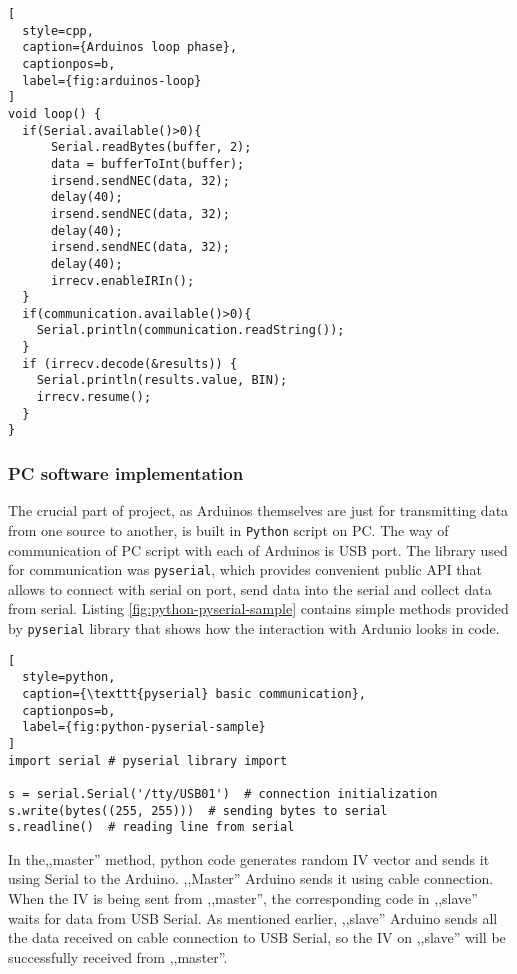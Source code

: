 \begin{minipage}{\linewidth}
\begin{lstlisting}[
  style=cpp,
  caption={Arduinos loop phase},
  captionpos=b,
  label={fig:arduinos-loop}
]
void loop() {
  if(Serial.available()>0){
      Serial.readBytes(buffer, 2);
      data = bufferToInt(buffer);
      irsend.sendNEC(data, 32);
      delay(40);
      irsend.sendNEC(data, 32);
      delay(40);
      irsend.sendNEC(data, 32);
      delay(40);
      irrecv.enableIRIn();
  }
  if(communication.available()>0){
    Serial.println(communication.readString());
  }
  if (irrecv.decode(&results)) {
    Serial.println(results.value, BIN);
    irrecv.resume(); 
  }
}
\end{lstlisting}
\end{minipage}
\subsubsection{PC software implementation}
The crucial part of project, as Arduinos themselves are just for transmitting data from one source to another, is built in \texttt{Python} script on PC. The way of communication of PC script with each of Arduinos is USB port. The library used for communication was \texttt{pyserial}, which provides convenient public API that allows to connect with serial on port, send data into the serial and collect data from serial. Listing \ref{fig:python-pyserial-sample} contains simple methods provided by \texttt{pyserial} library that shows how the interaction with Ardunio looks in code.

\begin{lstlisting}[
  style=python,
  caption={\texttt{pyserial} basic communication},
  captionpos=b,
  label={fig:python-pyserial-sample}
]
import serial # pyserial library import

s = serial.Serial('/tty/USB01')  # connection initialization
s.write(bytes((255, 255)))  # sending bytes to serial
s.readline()  # reading line from serial
\end{lstlisting}

In the,,master'' method, python code generates random IV vector and sends it using Serial to the Arduino. ,,Master'' Arduino sends it using cable connection. When the IV is being sent from ,,master'', the corresponding code in ,,slave'' waits for data from USB Serial. As mentioned earlier, ,,slave'' Arduino sends all the data received on cable connection to USB Serial, so the IV on ,,slave'' will be successfully received from ,,master''.

